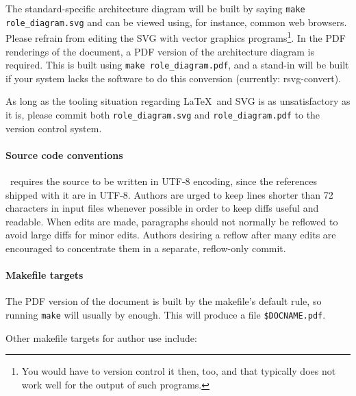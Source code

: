 \documentclass[11pt,a4paper]{ivoa}
\begin{document}
The standard-specific
architecture diagram will be built by saying \texttt{make
role\_diagram.svg} and can be viewed using, for instance, common web
browsers.  Please refrain from editing the SVG with vector graphics
programs\footnote{You would have to version control it then, too, and that
typically does not work well for the output of such programs.}.
In the PDF renderings of the document,
a PDF version of the architecture diagram is
required.  This is built using \texttt{make role\_diagram.pdf}, and a
stand-in will be built if your system lacks the software to do this
conversion (currently: rsvg-convert).

As long as the tooling situation regarding \LaTeX~and SVG is as
unsatisfactory as it is, please commit both \texttt{role\_diagram.svg} and
\texttt{role\_diagram.pdf} to the version control system.

\paragraph{Source code conventions}

\ivoatex\ requires the source to be written in UTF-8 encoding, since the
references shipped with it are in UTF-8.
Authors are urged to keep lines shorter than 72 characters in input
files whenever possible in order to keep diffs useful and readable.
When edits are made, paragraphs should not normally be reflowed to avoid
large diffs for minor edits.  Authors desiring a reflow after many edits
are encouraged to concentrate them in a separate, reflow-only commit.

\paragraph{Makefile targets}
\label{sec:targets}

The PDF version of the document is built by the makefile's default rule,
so running \texttt{make} will usually by enough.  This will produce a
file \texttt{\$DOCNAME.pdf}.

Other makefile targets for author use include:
\end{document}
